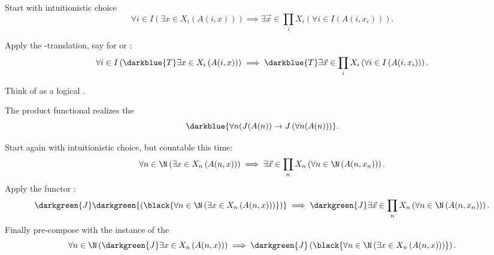 \documentclass%
[%
Screen4to3,
]{foils}
\begin{document}
Start with intuitionistic choice
\[
\forall i \in I \left(\exists x \in X_i \left(A(i,x)\right)\right)
\implies 
\exists \vec{x} \in \prod_i X_i\left(\forall i \in I\left(A(i,x_i)\right) \right).
\]

\vfill

Apply the -translation, say for  or
:
\[
\forall i \in I \left(\darkblue{T} \exists x \in X_i \left(A(i,x)\right)\right)
\implies 
\darkblue{T} \exists \vec{x} \in \prod_i X_i\left(\forall i \in I\left(A(i,x_i)\right) \right).
\]


Think of  as a logical .

\vfill


The product functional  realizes the  \\[2ex]
\[
\darkblue{\forall n (J(A(n)) \to
J\left(\forall n(A(n))\right)}.
\]

\vfill





 Start again with intuitionistic choice, but countable this time:
\[
\forall n \in \N \left(\exists x \in X_n \left(A(n,x)\right)\right)
\implies 
\exists \vec{x} \in \prod_n X_n\left(\forall n \in \N\left(A(n,x_n)\right) \right).
\]
 Apply the functor :
\[
\darkgreen{J} \darkgreen{\left(\black{\forall n \in \N \left(\exists x \in X_n \left(A(n,x)\right)\right)}\right)}
\implies 
\darkgreen{J}
\exists \vec{x} \in \prod_n X_n\left(\forall n \in \N\left(A(n,x_n)\right) \right).
\]
 Finally pre-compose with the instance of the  
\[
\forall n \in \N \left(\darkgreen{J} \exists x \in X_n \left(A(n,x)\right)\right)
\implies
\darkgreen{J} \left(\black{\forall n \in \N \left(\exists x \in X_n \left(A(n,x)\right)\right)}\right).
\]


\end{document}
